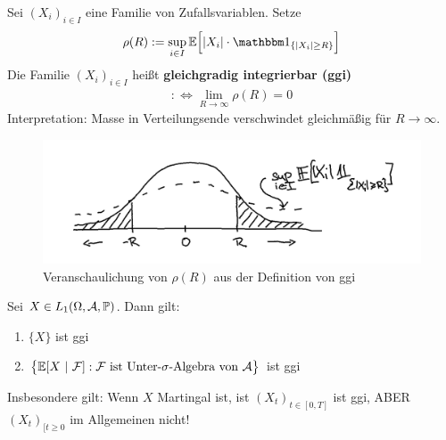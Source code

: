 \begin{defi}
	Sei $(X_i)_{i\in I}$ eine Familie von Zufallsvariablen. Setze
	\begin{align*}
		\rho(R):=\sup\limits_{i\in I}\E\Big[|X_i|\cdot\indi_{\lbrace |X_i|\geq R\rbrace}\Big]
	\end{align*}
	Die Familie $(X_i)_{i\in I}$ heißt \textbf{gleichgradig integrierbar (ggi)}
	\begin{align*}
		:\Longleftrightarrow\lim\limits_{R\to\infty}\rho(R)=0
	\end{align*}
	Interpretation: Masse in Verteilungsende verschwindet gleichmäßig für $R\to\infty$.
	\begin{figure}[!ht]
		\begin{center}
			\includegraphics[width=\textwidth]{pics/Sketch3.png}
			\caption{Veranschaulichung von $\rho(R)$ aus der Definition von ggi}
			\label{AbbRhoGGI}
		\end{center}
	\end{figure}
\end{defi}

\setcounter{satz}{2}
\begin{lemma}\label{lemma4.3}
	Sei $X\in L_1(\Omega,\mathcal{A},\mathbb{P})$. Dann gilt:
	\begin{enumerate}[label=(\alph*)]
		\item $\lbrace X\rbrace$ ist ggi
		\item $\big\lbrace\mathbb{E}[X~|~\mathcal{F}]:\mathcal{F}\text{ ist Unter-$\sigma$-Algebra von }\mathcal{A}\big\rbrace$ ist ggi
	\end{enumerate}
\end{lemma}

\begin{bemerkung}
	Insbesondere gilt: Wenn $X$ Martingal ist, ist $(X_t)_{t\in[0,T]}$ ist ggi, ABER $(X_t)_{[t\geq0}$ im Allgemeinen nicht!
\end{bemerkung}

